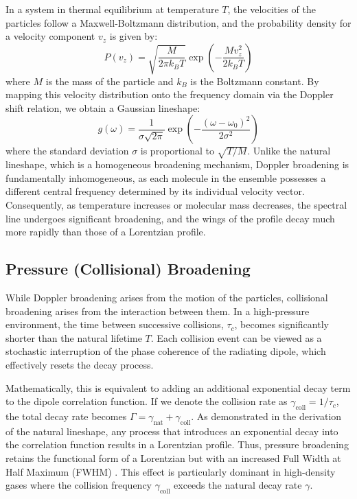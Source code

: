 \documentclass[8pt,a4paper]{report}
\begin{document}
	In a system in thermal equilibrium at temperature $T$, the velocities of the particles follow a Maxwell-Boltzmann distribution, and the probability density for a velocity component $v_z$ is given by:
	\begin{equation}
		P(v_z) = \sqrt{\frac{M}{2\pi k_B T}} \exp\left( -\frac{M v_z^2}{2 k_B T} \right)
	\end{equation}
	where $M$ is the mass of the particle and $k_B$ is the Boltzmann constant. By mapping this velocity distribution onto the frequency domain via the Doppler shift relation, we obtain a Gaussian lineshape:
	\begin{equation} \label{ls_doppler}
		g(\omega) = \frac{1}{\sigma \sqrt{2\pi}} \exp\left( -\frac{(\omega - \omega_0)^2}{2\sigma^2} \right)
	\end{equation}
	where the standard deviation $\sigma$ is proportional to $\sqrt{T/M}$. Unlike the natural lineshape, which is a homogeneous broadening mechanism, Doppler broadening is fundamentally inhomogeneous, as each molecule in the ensemble possesses a different central frequency determined by its individual velocity vector. Consequently, as temperature increases or molecular mass decreases, the spectral line undergoes significant broadening, and the wings of the profile decay much more rapidly than those of a Lorentzian profile.
	
	\subsection{Pressure (Collisional) Broadening}
	While Doppler broadening arises from the motion of the particles, collisional broadening arises from the interaction between them. In a high-pressure environment, the time between successive collisions, $\tau_c$, becomes significantly shorter than the natural lifetime $T$. Each collision event can be viewed as a stochastic interruption of the phase coherence of the radiating dipole, which effectively resets the decay process.
	
	Mathematically, this is equivalent to adding an additional exponential decay term to the dipole correlation function. If we denote the collision rate as $\gamma_{\text{coll}} = 1/\tau_c$, the total decay rate becomes $\Gamma = \gamma_{\text{nat}} + \gamma_{\text{coll}}$. As demonstrated in the derivation of the natural lineshape, any process that introduces an exponential decay into the correlation function results in a Lorentzian profile. Thus, pressure broadening retains the functional form of a Lorentzian but with an increased Full Width at Half Maximum (FWHM) \cite{book_lasers_siegman}. This effect is particularly dominant in high-density gases where the collision frequency $\gamma_{\text{coll}}$ exceeds the natural decay rate $\gamma$.
	
\end{document}
